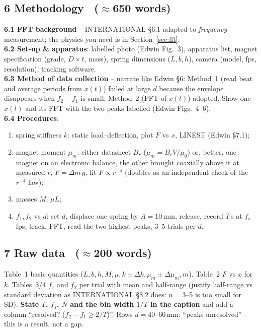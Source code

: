 \documentclass[11pt,a4paper]{article}
\newcommand{\muz}{\mu_0}
\newcommand{\mum}{\mu_m}
\newcommand{\words}[1]{~{\small\color{gray}($\approx$#1 words)}}
\begin{document}
\subsection*{6 Methodology \words{650}}
\textbf{6.1 FFT background} -- INTERNATIONAL \S6.1 adapted to \emph{frequency} measurement;
the physics you need is in Section~\ref{sec:fft}.\\
\textbf{6.2 Set-up \& apparatus}: labelled photo (Edwin Fig.~3), apparatus list, magnet
specification (grade, $D\times t$, mass), spring dimensions ($L,b,h$), camera (model,
fps, resolution), tracking software.\\
\textbf{6.3 Method of data collection} -- narrate like Edwin \S6: Method~1 (read beat and
average periods from $x(t)$) failed at large $d$ because the envelope disappears when
$f_2-f_1$ is small; Method~2 (FFT of $x(t)$) adopted. Show one $x(t)$ and its FFT with the
two peaks labelled (Edwin Figs.~4--6).\\
\textbf{6.4 Procedures}:
\begin{enumerate}[label=6.4.\arabic*]
\item spring stiffness $k$: static load--deflection, plot $F$ vs $x$, LINEST (Edwin \S7.1);
\item magnet moment $\mum$: either datasheet $B_r$ ($\mum=B_rV/\muz$) or, better, one
magnet on an electronic balance, the other brought coaxially above it at measured $r$,
$F=\Delta m\,g$, fit $F\propto r^{-4}$ (doubles as an independent check of the $r^{-4}$ law);
\item masses $M$, $\mu L$;
\item $f_1,f_2$ vs $d$: set $d$, displace one spring by $A=10$\,mm, release, record $T$\,s
at $f_s$ fps, track, FFT, read the two highest peaks, 3--5 trials per $d$.
\end{enumerate}

\subsection*{7 Raw data \words{200}}
Table~1 basic quantities ($L,b,h,M,\mu,k\pm\Delta k,\mum\pm\Delta\mum,m$). Table~2 $F$ vs
$x$ for $k$. Tables~3/4 $f_1$ and $f_2$ per trial with mean and half-range (justify
half-range vs standard deviation as INTERNATIONAL \S8.2 does: $n=3$--5 is too small for
SD). \textbf{State $T$, $f_s$, $N$ and the bin width $1/T$ in the caption} and add a
column ``resolved? ($f_2-f_1\ge2/T$)''. Rows $d=40$--60\,mm: ``peaks unresolved'' -- this
is a result, not a gap.
\end{document}
